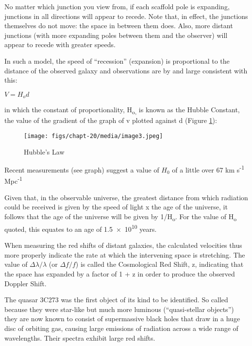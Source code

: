 \documentclass[revision-guide.tex]{subfiles}
\begin{document}
No matter which junction you view from, if each scaffold pole is
expanding, junctions in all directions will appear to recede. Note that,
in effect, the junctions themselves do not move: the space in between
them does. Also, more distant junctions (with more expanding poles
between them and the observer) will appear to recede with greater
speeds.

In such a model, the speed of ``recession'' (expansion) is proportional
to the distance of the observed galaxy and observations are by and large
consistent with this:

$ V = H_{o} d$

in which the constant of proportionality, H\textsubscript{o,} is known
as the Hubble Constant, the value of the gradient of the graph of v
plotted against d (Figure \ref{hubble-law}):

\begin{figure}[h]
\texttt{[image: figs/chapt-20/media/image3.jpeg]}
\caption{Hubble's Law}
\label{hubble-law}
\end{figure}

Recent measurements (see graph) suggest a value of $H_0$ of
a little over 67 km s\textsuperscript{-1} Mpc\textsuperscript{-1}

Given that, in the observable universe, the greatest distance from which
radiation could be received is given by the speed of light x the age of
the universe, it follows that the age of the universe will be given by
1/H\textsubscript{o}. For the value of H\textsubscript{o} quoted, this
equates to an age of \num{1.5e10} years.

When measuring the red shifts of distant galaxies, the calculated
velocities thus more properly indicate the rate at which the intervening
space is stretching. The value of $\Delta\lambda/\lambda$ (or $\Delta f/f$) is called the
Cosmological Red Shift, z, indicating that the space has expanded by a
factor of 1 + z in order to produce the observed Doppler Shift.


The quasar 3C273 was the first object of its kind to be identified. So
called because they were star-like but much more luminous
(``quasi-stellar objects'') they are now known to consist of
supermassive black holes that draw in a huge disc of orbiting gas,
causing large emissions of radiation across a wide range of wavelengths.
Their spectra exhibit large red shifts.
\end{document}
